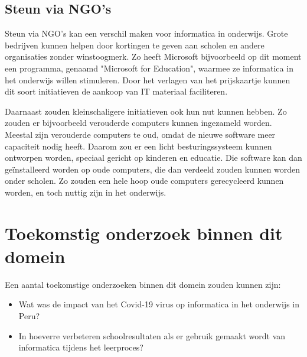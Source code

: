 \subsection{Steun via NGO's}
Steun via NGO's kan een verschil maken voor informatica in onderwijs. Grote bedrijven kunnen helpen door kortingen te geven aan scholen en andere organisaties zonder winstoogmerk. Zo heeft Microsoft bijvoorbeeld op dit moment een programma, genaamd "Microsoft for Education", waarmee ze informatica in het onderwijs willen stimuleren. Door het verlagen van het prijskaartje kunnen dit soort initiatieven de aankoop van IT materiaal faciliteren.


Daarnaast zouden kleinschaligere initiatieven ook hun nut kunnen hebben. Zo zouden er bijvoorbeeld verouderde computers kunnen ingezameld worden. Meestal zijn verouderde computers te oud, omdat de nieuwe software meer capaciteit nodig heeft. Daarom zou er een licht besturingssysteem kunnen ontworpen worden, speciaal gericht op kinderen en educatie. Die software kan dan geïnstalleerd worden op oude computers, die dan verdeeld zouden kunnen worden onder scholen. Zo zouden een hele hoop oude computers gerecycleerd kunnen worden, en toch nuttig zijn in het onderwijs.

\section{Toekomstig onderzoek binnen dit domein}

Een aantal toekomstige onderzoeken binnen dit domein zouden kunnen zijn: 
\begin{itemize}
	\item Wat was de impact van het Covid-19 virus op informatica in het onderwijs in Peru?
	\item In hoeverre verbeteren schoolresultaten als er gebruik gemaakt wordt van informatica tijdens het leerproces?
\end{itemize}

